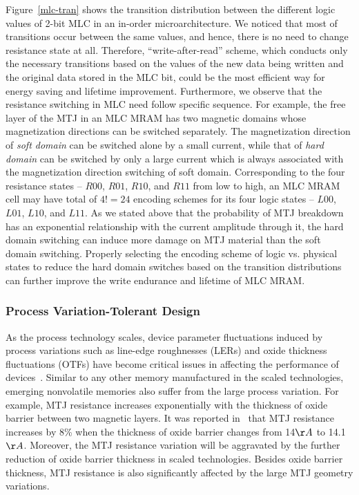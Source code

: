 Figure~\ref{mlc-tran} shows the transition distribution between the different logic values of 2-bit MLC in an in-order microarchitecture. We noticed that most of transitions occur between the same values, and hence, there is no need to change resistance state at all. Therefore, ``write-after-read'' scheme, which conducts only the necessary transitions based on the values of the new data being written and the original data stored in the MLC bit, could be the most efficient way for energy saving and lifetime improvement. Furthermore, we observe that the resistance switching in MLC need follow specific sequence. For example, the free layer of the MTJ in an MLC MRAM has two magnetic domains whose magnetization directions can be switched separately. The magnetization direction of \emph{soft domain} can be switched alone by a small current, while that of \emph{hard domain} can be switched by only a large current which is always associated with the magnetization direction switching of soft domain. Corresponding to the four resistance states -- $R00$, $R01$, $R10$, and $R11$ from low to high, an MLC MRAM cell may have total of $4! = 24$ encoding schemes for its four logic states -- $L00$, $L01$, $L10$, and $L11$. As we stated above that the probability of MTJ breakdown has an exponential relationship with the current amplitude through it, the hard domain switching can induce more damage on MTJ material than the soft domain switching. Properly selecting the encoding scheme of logic vs. physical states to reduce the hard domain switches based on the transition distributions can further improve the write endurance and lifetime of MLC MRAM.


\subsubsection{Process Variation-Tolerant Design}

As the process technology scales, device parameter fluctuations induced by process variations such as line-edge roughnesses (LERs) and oxide thickness fluctuations (OTFs) have become critical issues in affecting the performance of devices~\cite{Asenov03}. Similar to any other memory manufactured in the scaled technologies, emerging nonvolatile memories also suffer from the large process variation. For example, MTJ resistance increases exponentially with the thickness of oxide barrier between two magnetic layers. It was reported in~\cite{Tehrani00} that MTJ resistance increases by 8\% when the thickness of oxide barrier changes from 14${\AA}$ to 14.1${\AA}$. Moreover, the MTJ resistance variation will be aggravated by the further reduction of oxide barrier thickness in scaled technologies. Besides oxide barrier thickness, MTJ resistance is also significantly affected by the large MTJ geometry variations.

